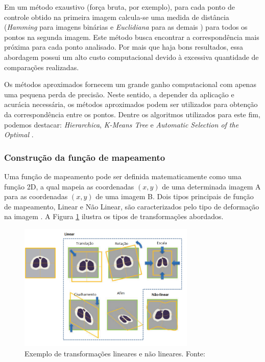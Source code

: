 \documentclass[12pt]{article}
\begin{document}
Em um método exaustivo (força bruta, por exemplo), para cada ponto de controle obtido na primeira imagem calcula-se uma medida de distância (\textit{Hamming} para imagens binárias e \textit{Euclidiana} para as demais \cite{PANTANO}) para todos os pontos na segunda imagem. Este método busca encontrar a correspondência mais próxima para cada ponto analisado. Por mais que haja bons resultados, essa abordagem possui um alto custo computacional devido à excessiva quantidade de comparações realizadas.

Os métodos aproximados fornecem um grande ganho computacional com apenas uma pequena perda de precisão. Neste sentido, a depender da aplicação e acurácia necessária, os métodos aproximados podem ser utilizados para obtenção da correspondência entre os pontos. Dentre os algoritmos utilizados para este fim, podemos destacar: \textit{Hierarchica}, \textit{K-Means Tree} e \textit{Automatic Selection of the Optimal} \cite{PANTANO}.

\subsubsection{Construção da função de mapeamento}

Uma função de mapeamento pode ser definida matematicamente como uma função 2D, a qual mapeia as coordenadas $(x,y)$ de uma determinada imagem A para as coordenadas $(x,y)$ de uma imagem B. Dois tipos principais de função de mapeamento, Linear e Não Linear, são caracterizados pelo tipo de deformação na imagem \cite{b7}. A Figura \ref{fig:funcao_mapeamento} ilustra os tipos de transformações abordados.

\begin{figure}[!ht]
    \centering
    \includegraphics[width=0.75\textwidth]{figures/transformations_nova.png}
    \caption{Exemplo de transformações lineares e não lineares. Fonte: \cite{Uchida2013ImagePA}}
    \label{fig:funcao_mapeamento}
\end{figure}
\end{document}
